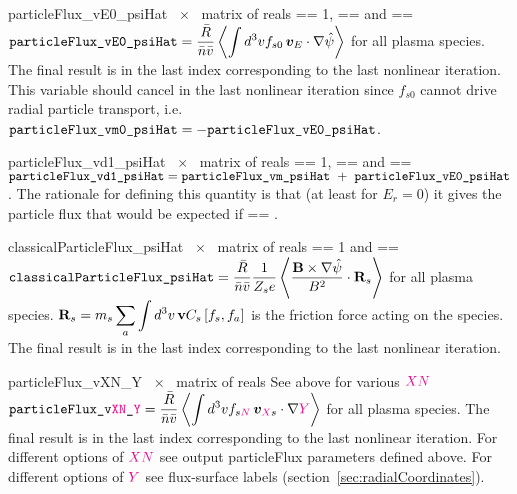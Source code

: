 \myhrule

{particleFlux_vE0_psiHat}
{~$\times$~ matrix of reals}
{ == 1,  == \true and  == \true}
{$\displaystyle \text{\ttfamily particleFlux\_vE0\_psiHat} = \frac{\bar{R}}{\bar{n} \bar{v}} \left\langle \int d^3v f_{s0} \, \bm{v}_{E} \cdot \nabla \hat{\psi}\right\rangle$ for all plasma species. The final result is in the last index corresponding to the last nonlinear iteration. This variable should cancel  in the last nonlinear iteration since $f_{s0}$ cannot drive radial particle transport, i.e. $\displaystyle \text{\ttfamily particleFlux\_vm0\_psiHat} = - \text{\ttfamily particleFlux\_vE0\_psiHat}$.}

\myhrule

{particleFlux_vd1_psiHat}
{~$\times$~ matrix of reals}
{ == 1,  == \true and  == \true}
{$\displaystyle \text{\ttfamily particleFlux\_vd1\_psiHat} = \text{\ttfamily particleFlux\_vm\_psiHat}~+~\text{\ttfamily particleFlux\_vE0\_psiHat}$. The rationale for defining this quantity is that (at least for $E_r = 0$) it gives the particle flux that would be expected if  == \false.}

\myhrule

{classicalParticleFlux_psiHat}
{%
~$\times$~ matrix of reals}
{ == 1 and  == \true}
{$\displaystyle \text{\ttfamily classicalParticleFlux\_psiHat} = \frac{\bar{R}}{\bar{n} \bar{v}} \frac{1}{Z_s e} \left\langle \frac{{\mathbf B} \times \nabla \hat{\psi}}{B^2} \cdot {\mathbf R}_s \right\rangle$ for all plasma species. $\displaystyle {\mathbf R}_s = m_s \sum_a \int d^3v \, {\mathbf v} C_s \left[f_s, f_a\right]$ is the friction force acting on the species. The final result is in the last index corresponding to the last nonlinear iteration.}

\myhrule

{particleFlux_vXN_Y}
{~$\times$~ matrix of reals}
{See above for various $\textcolor{magenta}{XN}$}
{$\displaystyle \text{\ttfamily particleFlux\_v\textcolor{magenta}{XN}\_\textcolor{magenta}{Y}} = \frac{\bar{R}}{\bar{n} \bar{v}} \left\langle \int d^3v f_{s\textcolor{magenta}{N}} \, \bm{v}_{\textcolor{magenta}{X}s} \cdot \nabla \textcolor{magenta}{Y}\right\rangle$ for all plasma species. The final result is in the last index corresponding to the last nonlinear iteration.\newline
For different options of $\textcolor{magenta}{XN}$ see output {\ttfamily particleFlux} parameters defined above.\newline 
For different options of $\textcolor{magenta}{Y}$ see flux-surface labels (section~\ref{sec:radialCoordinates}).}


